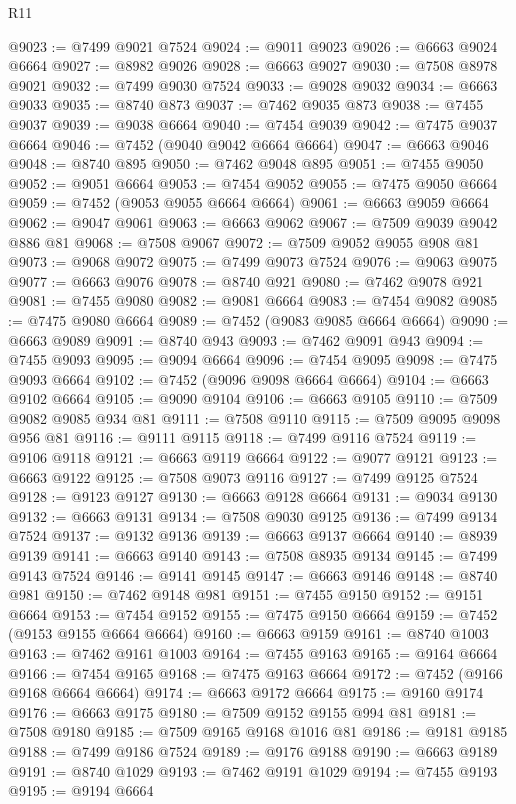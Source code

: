 \begin{lexlean}{R11}
\begin{coremodule}
{{{{{{{{{{{{{{{{{{{{{{{{{{{{{{{{{{{{{{{{{{{{{{{{{{{{{{{{{{{{{{{{{{{{{{{{{{{{{{{{{{@9023 := @7499 @9021 @7524
@9024 := @9011 @9023
@9026 := @6663 @9024 @6664
@9027 := @8982 @9026
@9028 := @6663 @9027
@9030 := @7508 @8978 @9021
@9032 := @7499 @9030 @7524
@9033 := @9028 @9032
@9034 := @6663 @9033
@9035 := @8740 @873
@9037 := @7462 @9035 @873
@9038 := @7455 @9037
@9039 := @9038 @6664
@9040 := @7454 @9039
@9042 := @7475 @9037 @6664
@9046 := @7452 (@9040 @9042 @6664 @6664)
@9047 := @6663 @9046
@9048 := @8740 @895
@9050 := @7462 @9048 @895
@9051 := @7455 @9050
@9052 := @9051 @6664
@9053 := @7454 @9052
@9055 := @7475 @9050 @6664
@9059 := @7452 (@9053 @9055 @6664 @6664)
@9061 := @6663 @9059 @6664
@9062 := @9047 @9061
@9063 := @6663 @9062
@9067 := @7509 @9039 @9042 @886 @81
@9068 := @7508 @9067
@9072 := @7509 @9052 @9055 @908 @81
@9073 := @9068 @9072
@9075 := @7499 @9073 @7524
@9076 := @9063 @9075
@9077 := @6663 @9076
@9078 := @8740 @921
@9080 := @7462 @9078 @921
@9081 := @7455 @9080
@9082 := @9081 @6664
@9083 := @7454 @9082
@9085 := @7475 @9080 @6664
@9089 := @7452 (@9083 @9085 @6664 @6664)
@9090 := @6663 @9089
@9091 := @8740 @943
@9093 := @7462 @9091 @943
@9094 := @7455 @9093
@9095 := @9094 @6664
@9096 := @7454 @9095
@9098 := @7475 @9093 @6664
@9102 := @7452 (@9096 @9098 @6664 @6664)
@9104 := @6663 @9102 @6664
@9105 := @9090 @9104
@9106 := @6663 @9105
@9110 := @7509 @9082 @9085 @934 @81
@9111 := @7508 @9110
@9115 := @7509 @9095 @9098 @956 @81
@9116 := @9111 @9115
@9118 := @7499 @9116 @7524
@9119 := @9106 @9118
@9121 := @6663 @9119 @6664
@9122 := @9077 @9121
@9123 := @6663 @9122
@9125 := @7508 @9073 @9116
@9127 := @7499 @9125 @7524
@9128 := @9123 @9127
@9130 := @6663 @9128 @6664
@9131 := @9034 @9130
@9132 := @6663 @9131
@9134 := @7508 @9030 @9125
@9136 := @7499 @9134 @7524
@9137 := @9132 @9136
@9139 := @6663 @9137 @6664
@9140 := @8939 @9139
@9141 := @6663 @9140
@9143 := @7508 @8935 @9134
@9145 := @7499 @9143 @7524
@9146 := @9141 @9145
@9147 := @6663 @9146
@9148 := @8740 @981
@9150 := @7462 @9148 @981
@9151 := @7455 @9150
@9152 := @9151 @6664
@9153 := @7454 @9152
@9155 := @7475 @9150 @6664
@9159 := @7452 (@9153 @9155 @6664 @6664)
@9160 := @6663 @9159
@9161 := @8740 @1003
@9163 := @7462 @9161 @1003
@9164 := @7455 @9163
@9165 := @9164 @6664
@9166 := @7454 @9165
@9168 := @7475 @9163 @6664
@9172 := @7452 (@9166 @9168 @6664 @6664)
@9174 := @6663 @9172 @6664
@9175 := @9160 @9174
@9176 := @6663 @9175
@9180 := @7509 @9152 @9155 @994 @81
@9181 := @7508 @9180
@9185 := @7509 @9165 @9168 @1016 @81
@9186 := @9181 @9185
@9188 := @7499 @9186 @7524
@9189 := @9176 @9188
@9190 := @6663 @9189
@9191 := @8740 @1029
@9193 := @7462 @9191 @1029
@9194 := @7455 @9193
@9195 := @9194 @6664
}}}}}}}}}}}}}}}}}}}}}}}}}}}}}}}}}}}}}}}}}}}}}}}}}}}}}}}}}}}}}}}}}}}}}}}}}}}}}}}}}}
\end{coremodule}
\end{lexlean}
